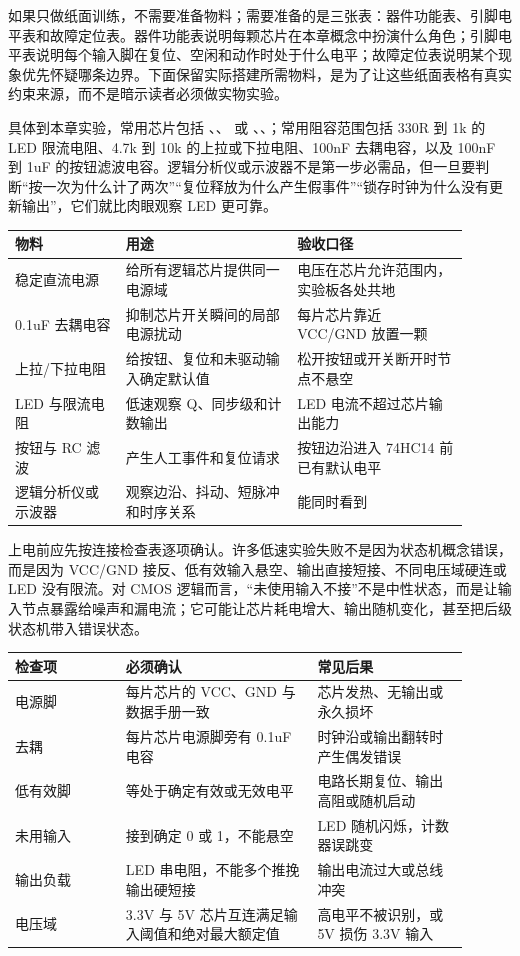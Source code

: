如果只做纸面训练，不需要准备物料；需要准备的是三张表：器件功能表、引脚电平表和故障定位表。器件功能表说明每颗芯片在本章概念中扮演什么角色；引脚电平表说明每个输入脚在复位、空闲和动作时处于什么电平；故障定位表说明某个现象优先怀疑哪条边界。下面保留实际搭建所需物料，是为了让这些纸面表格有真实约束来源，而不是暗示读者必须做实物实验。

具体到本章实验，常用芯片包括 、、 或 、、；常用阻容范围包括 330R 到 1k 的 LED 限流电阻、4.7k 到 10k 的上拉或下拉电阻、100nF 去耦电容，以及 100nF 到 1uF 的按钮滤波电容。逻辑分析仪或示波器不是第一步必需品，但一旦要判断“按一次为什么计了两次”“复位释放为什么产生假事件”“锁存时钟为什么没有更新输出”，它们就比肉眼观察 LED 更可靠。

\begin{longtable}{L{0.22\linewidth}L{0.34\linewidth}L{0.34\linewidth}}
\toprule
物料 & 用途 & 验收口径 \\
\midrule
稳定直流电源 & 给所有逻辑芯片提供同一电源域 & 电压在芯片允许范围内，实验板各处共地 \\
0.1uF 去耦电容 & 抑制芯片开关瞬间的局部电源扰动 & 每片芯片靠近 VCC/GND 放置一颗 \\
上拉/下拉电阻 & 给按钮、复位和未驱动输入确定默认值 & 松开按钮或开关断开时节点不悬空 \\
LED 与限流电阻 & 低速观察 Q、同步级和计数输出 & LED 电流不超过芯片输出能力 \\
按钮与 RC 滤波 & 产生人工事件和复位请求 & 按钮边沿进入 74HC14 前已有默认电平 \\
逻辑分析仪或示波器 & 观察边沿、抖动、短脉冲和时序关系 & 能同时看到  \\
\bottomrule
\end{longtable}

上电前应先按连接检查表逐项确认。许多低速实验失败不是因为状态机概念错误，而是因为 VCC/GND 接反、低有效输入悬空、输出直接短接、不同电压域硬连或 LED 没有限流。对 CMOS 逻辑而言，“未使用输入不接”不是中性状态，而是让输入节点暴露给噪声和漏电流；它可能让芯片耗电增大、输出随机变化，甚至把后级状态机带入错误状态。

\begin{longtable}{L{0.22\linewidth}L{0.38\linewidth}L{0.3\linewidth}}
\toprule
检查项 & 必须确认 & 常见后果 \\
\midrule
电源脚 & 每片芯片的 VCC、GND 与数据手册一致 & 芯片发热、无输出或永久损坏 \\
去耦 & 每片芯片电源脚旁有 0.1uF 电容 & 时钟沿或输出翻转时产生偶发错误 \\
低有效脚 &  等处于确定有效或无效电平 & 电路长期复位、输出高阻或随机启动 \\
未用输入 & 接到确定 0 或 1，不能悬空 & LED 随机闪烁，计数器误跳变 \\
输出负载 & LED 串电阻，不能多个推挽输出硬短接 & 输出电流过大或总线冲突 \\
电压域 & 3.3V 与 5V 芯片互连满足输入阈值和绝对最大额定值 & 高电平不被识别，或 5V 损伤 3.3V 输入 \\
\bottomrule
\end{longtable}

